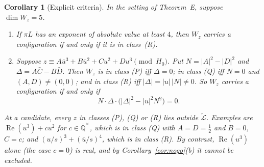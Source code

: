 \documentclass[11pt,a4paper]{article}
\theoremstyle{plain}
\newtheorem{corollary}[theorem]{Corollary}
\theoremstyle{definition}
\newcommand{\Qbar}{\overline{\mathbb{Q}}}
\newcommand{\Lt}{\widetilde{\mathcal{L}}}
\renewcommand{\Re}{\operatorname{Re}}
\begin{document}
\begin{corollary}[Explicit criteria]\label{cor:E}
In the setting of Theorem~E, suppose $\dim W_{z}=5$.
\begin{enumerate}[label=\textup{(\alph*)}]
\item If $\pi L$ has an exponent of absolute value at least $4$, then $W_{z}$ carries a
configuration if and only if it is in class~(R).
\item Suppose $z\equiv A\bar u^{3}+B\bar u^{2}+Cu^{2}+Du^{3}\pmod{H_{0}}$. Put
$N=|A|^{2}-|D|^{2}$ and $\Delta=A\bar C-B\bar D$. Then $W_{z}$ is in class
(P) iff $\Delta=0$; in class (Q) iff $N=0$ and $(A,D)\neq(0,0)$; and in class (R) iff
$|\Delta|=|u|\,|N|\neq0$. So $W_{z}$ carries a configuration if and only if
\[
  N\cdot\Delta\cdot\bigl(|\Delta|^{2}-|u|^{2}N^{2}\bigr)=0 .
\]
\end{enumerate}
At a candidate, every $z$ in classes (P), (Q) or (R) lies outside $\Lt$. Examples are
$\Re(u^{3})+cu^{2}$ for $c\in\Qbar^{\times}$, which is in class (Q) with $A=D=\tfrac12$ and
$B=0$, $C=c$; and $(u/s)^{3}+(\bar u/s)^{4}$, which is in class (R). By contrast,
$\Re(u^{3})$ alone (the case $c=0$) is real, and by Corollary~\ref{cor:nogo}(b) it
cannot be excluded.
\end{corollary}
\end{document}
